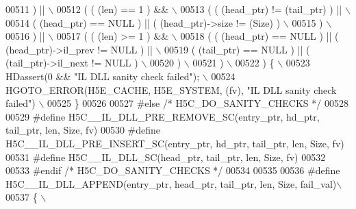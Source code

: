 \begin{DoxyCode}
00511 \textcolor{preprocessor}{     ) ||                                                                  \(\backslash\)}
00512 \textcolor{preprocessor}{     ( ( (len) == 1 ) &&                                                   \(\backslash\)}
00513 \textcolor{preprocessor}{       ( ( (head\_ptr) != (tail\_ptr) ) ||                                   \(\backslash\)}
00514 \textcolor{preprocessor}{         ( (head\_ptr) == NULL ) || ( (head\_ptr)->size != (Size) )          \(\backslash\)}
00515 \textcolor{preprocessor}{       )                                                                   \(\backslash\)}
00516 \textcolor{preprocessor}{     ) ||                                                                  \(\backslash\)}
00517 \textcolor{preprocessor}{     ( ( (len) >= 1 ) &&                                                   \(\backslash\)}
00518 \textcolor{preprocessor}{       ( ( (head\_ptr) == NULL ) || ( (head\_ptr)->il\_prev != NULL ) ||      \(\backslash\)}
00519 \textcolor{preprocessor}{         ( (tail\_ptr) == NULL ) || ( (tail\_ptr)->il\_next != NULL )         \(\backslash\)}
00520 \textcolor{preprocessor}{       )                                                                   \(\backslash\)}
00521 \textcolor{preprocessor}{     )                                                                     \(\backslash\)}
00522 \textcolor{preprocessor}{   ) \{                                                                     \(\backslash\)}
00523 \textcolor{preprocessor}{    HDassert(0 && "IL DLL sanity check failed");                           \(\backslash\)}
00524 \textcolor{preprocessor}{    HGOTO\_ERROR(H5E\_CACHE, H5E\_SYSTEM, (fv), "IL DLL sanity check failed") \(\backslash\)}
00525 \textcolor{preprocessor}{\}}
00526 
00527 \textcolor{preprocessor}{#else }\textcolor{comment}{/* H5C\_DO\_SANITY\_CHECKS */}\textcolor{preprocessor}{}
00528 
00529 \textcolor{preprocessor}{#define H5C\_\_IL\_DLL\_PRE\_REMOVE\_SC(entry\_ptr, hd\_ptr, tail\_ptr, len, Size, fv)}
00530 \textcolor{preprocessor}{#define H5C\_\_IL\_DLL\_PRE\_INSERT\_SC(entry\_ptr, hd\_ptr, tail\_ptr, len, Size, fv)}
00531 \textcolor{preprocessor}{#define H5C\_\_IL\_DLL\_SC(head\_ptr, tail\_ptr, len, Size, fv)}
00532 
00533 \textcolor{preprocessor}{#endif }\textcolor{comment}{/* H5C\_DO\_SANITY\_CHECKS */}\textcolor{preprocessor}{}
00534 
00535 
00536 \textcolor{preprocessor}{#define H5C\_\_IL\_DLL\_APPEND(entry\_ptr, head\_ptr, tail\_ptr, len, Size, fail\_val)\(\backslash\)}
00537 \textcolor{preprocessor}{\{                                                                             \(\backslash\)}

\end{DoxyCode}
